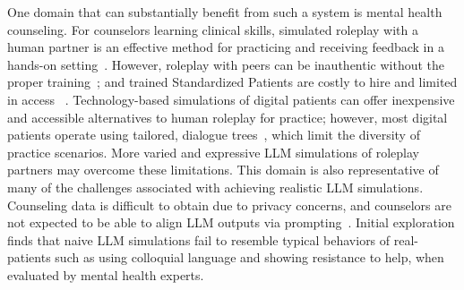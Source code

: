 \documentclass[11pt]{article}
\newcommand{\raj}[1]{\ifthenelse{\boolean{showcomments}}{\textcolor{purple}{[#1 —raj]}}{}}
\begin{document}
One domain that can substantially benefit from such a system is mental health counseling. For counselors learning clinical skills, simulated roleplay with a human partner is an effective method for practicing and receiving feedback in a hands-on setting~\cite{oh2015effects}. %
However, roleplay with peers can be inauthentic without the proper training~\cite{ay2023can}; and trained Standardized Patients are costly to hire and limited in access ~\cite{kuhne2020standardized}. 
Technology-based simulations of digital patients can offer inexpensive and accessible alternatives to human roleplay for practice; however, most digital patients operate using tailored, dialogue trees~\cite{shorey2019virtual, othlinghaus2020seriousroleplaying}, which limit the diversity of practice scenarios.
More varied and expressive LLM simulations of roleplay partners may overcome these limitations.
This domain is also representative of many of the challenges associated with achieving realistic LLM simulations. Counseling data is difficult to obtain due to privacy concerns, and counselors are not expected to be able to align LLM outputs via prompting~\cite{whyjohnnycantprompt}. Initial exploration finds that naive LLM simulations fail to resemble typical behaviors of real-patients such as using colloquial language and showing resistance to help, when evaluated by mental health experts. 
\fi
\end{document}
